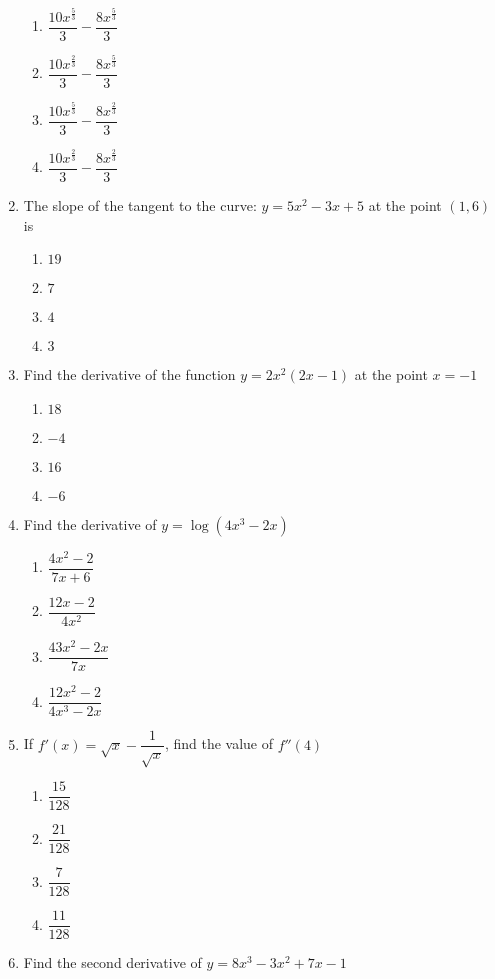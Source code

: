 \begin{multicols}{2}
\begin{enumerate}[label={\arabic*.}]
\begin{enumerate}[label={\Alph*.}]
	\item \(\dfrac{10{x}^{\frac{5}{3}}}{3} -\dfrac{8{x}^{\frac{5}{3}}}{3}\)
	\item \(\dfrac{10{x}^{\frac{2}{3}}}{3} -\dfrac{8{x}^{\frac{5}{3}}}{3}\)
	\item \(\dfrac{10{x}^{\frac{5}{3}}}{3} -\dfrac{8{x}^{\frac{2}{3}}}{3}\)
	\item \(\dfrac{10{x}^{\frac{2}{3}}}{3} -\dfrac{8{x}^{\frac{2}{3}}}{3}\)
	\end{enumerate}
\item The slope of the tangent to the curve: \(y=5{x}^{2}-3x+5\) at the point \((1,6)\) is
	\begin{enumerate}[label={\Alph*.}]
	\item \(19\)
	\item \(7\)
	\item \(4\)
	\item \(3\)
	\end{enumerate}
\item Find the derivative of the function \(y=2{x}^{2}(2x-1)\) at the point \(x = -1\)
	\begin{enumerate}[label={\Alph*.}]
	\item \(18\)
	\item \(-4\)
	\item \(16\)
	\item \(-6\)
	\end{enumerate}
\item Find the derivative of  \(y = \log(4{x}^{3} - 2x)\)
	\begin{enumerate}[label={\Alph*.}]
	\item \(\dfrac{4{x}^{2}-2}{7x+6}\)
	\item \(\dfrac{12x-2}{4{x}^{2}}\)
	\item \(\dfrac{43{x}^{2}-2x}{7x}\)
	\item \(\dfrac{12{x}^{2}-2}{4{x}^{3}-2x}\)
	\end{enumerate}
\item If \(f'(x) = \sqrt{x} - \dfrac{1}{\sqrt{x}}\), find the value of \(f''(4)\)
	\begin{enumerate}[label={\Alph*.}]
	\item \(\dfrac{15}{128}\)
	\item \(\dfrac{21}{128}\)
	\item \(\dfrac{7}{128}\)
	\item \(\dfrac{11}{128}\)
	\end{enumerate}
\item Find the second derivative of \(y = 8{x}^{3} - 3{x}^{2} + 7x - 1\)

\end{enumerate}
\end{multicols}
